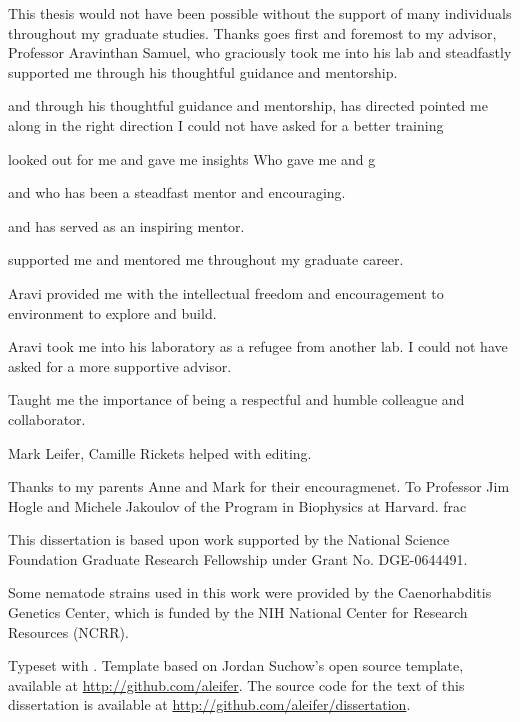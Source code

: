 
This thesis would not have been possible without the support of many individuals throughout my graduate studies. Thanks goes first and foremost to my advisor, Professor Aravinthan Samuel, who graciously took me into his lab and steadfastly supported me through his thoughtful guidance and mentorship. 


and through his thoughtful guidance and mentorship, has directed 
pointed me along in the right direction
I could not have asked for a better training

looked out for me and gave me insights 
Who gave me 
and g

and who has been a steadfast mentor and encouraging. 


and has served as an inspiring mentor. 

supported me and mentored me throughout my graduate career. 

Aravi provided me with the intellectual freedom and encouragement to  environment to explore and build.


Aravi took me into his laboratory as a refugee from another lab. I could not have asked for a more supportive advisor. 

Taught me the importance of being a respectful and humble colleague and collaborator. 


Mark Leifer, Camille Rickets helped with editing. 


Thanks to my parents Anne and Mark for their encouragmenet. To Professor Jim Hogle and Michele Jakoulov of the Program in Biophysics at Harvard. 
frac

This dissertation is based upon work supported by the National Science Foundation 
Graduate Research Fellowship under Grant No. DGE-0644491.
%
%
%
%
%
%
%
%   
%
%
%
%   
%

Some nematode strains used in this work were provided by the Caenorhabditis Genetics Center, which is funded by the NIH National Center for Research Resources (NCRR).

Typeset with \XeTeX. Template based on Jordan Suchow's open source template, available at \href{https://github.com/aleifer/LaTeX-template-for-Harvard-dissertation}{http://github.com/aleifer}.
The source code for the text of this dissertation is available at \url{http://github.com/aleifer/dissertation}.